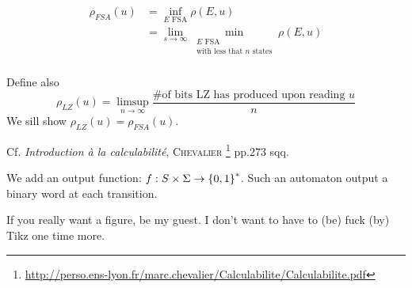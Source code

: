 \[
    \begin{aligned}
        \rho_{FSA}(u) &= \inf\limits_{E\text{ FSA}} \rho(E,u)\\
        &= \lim\limits_{s \to \infty}\min\limits_{\substack{E\text{ FSA}\\\text{with less that }n \text{ states}}} \rho(E,u)\\
    \end{aligned}
\]

Define also
\[
        \rho_{LZ}(u) = \limsup\limits_{n\to\infty} \frac{\text{\# of bits LZ has produced upon reading }u}{n}
\]
We sill show $\rho_{LZ}(u) = \rho_{FSA}(u)$.

\begin{definition}
    Cf. \textit{Introduction à la calculabilité}, \textsc{Chevalier} \footnote{\url{http://perso.ens-lyon.fr/marc.chevalier/Calculabilite/Calculabilite.pdf}} pp.273 sqq.
\end{definition}

We add an output function: $f:S\times \Sigma \to \left\{ 0,1 \right\}^*$. Such an automaton output a binary word at each transition.

If you really want a figure, be my guest. I don't want to have to (be) fuck (by) Tikz one time more.